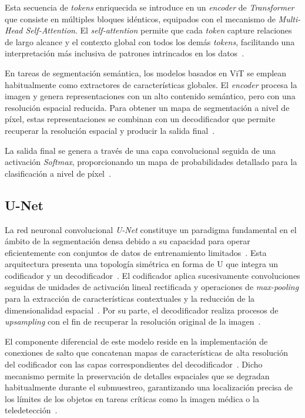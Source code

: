 Esta secuencia de \textit{tokens} enriquecida se introduce en un \textit{encoder} de \textit{Transformer} que consiste en múltiples bloques idénticos, equipados con el mecanismo de \textit{Multi-Head Self-Attention}. El \textit{self-attention} permite que cada \textit{token} capture relaciones de largo alcance y el contexto global con todos los demás \textit{tokens}, facilitando una interpretación más inclusiva de patrones intrincados en los datos~\cite{khan2022transformersvision, bala2025visiontranscoder}.

En tareas de segmentación semántica, los modelos basados en ViT se emplean habitualmente como extractores de características globales. El \textit{encoder} procesa la imagen y genera representaciones con un alto contenido semántico, pero con una resolución espacial reducida. Para obtener un mapa de segmentación a nivel de píxel, estas representaciones se combinan con un decodificador que permite recuperar la resolución espacial y producir la salida final~\cite{bala2025visiontranscoder}.

La salida final se genera a través de una capa convolucional seguida de una activación \textit{Softmax}, proporcionando un mapa de probabilidades detallado para la clasificación a nivel de píxel~\cite{zhang2022constructionautomation, bala2025visiontranscoder}. 

\subsection{U-Net}
La red neuronal convolucional \textit{U-Net} constituye un paradigma fundamental en el ámbito de la segmentación densa debido a su capacidad para operar eficientemente con conjuntos de datos de entrenamiento limitados~\cite{ronneberger2015unet}. Esta arquitectura presenta una topología simétrica en forma de U que integra un codificador y un decodificador~\cite{ronneberger2015unet, Dimitrovski2024}. El codificador aplica sucesivamente convoluciones seguidas de unidades de activación lineal rectificada y operaciones de \textit{max-pooling} para la extracción de características contextuales y la reducción de la dimensionalidad espacial~\cite{ronneberger2015unet, ji2022automation}. Por su parte, el decodificador realiza procesos de \textit{upsampling} con el fin de recuperar la resolución original de la imagen~\cite{ronneberger2015unet, badrinarayanan2016segnet}. 

El componente diferencial de este modelo reside en la implementación de conexiones de salto que concatenan mapas de características de alta resolución del codificador con las capas correspondientes del decodificador~\cite{ronneberger2015unet, diezpastora2025trails}. Dicho mecanismo permite la preservación de detalles espaciales que se degradan habitualmente durante el submuestreo, garantizando una localización precisa de los límites de los objetos en tareas críticas como la imagen médica o la teledetección~\cite{Dimitrovski2024}.


